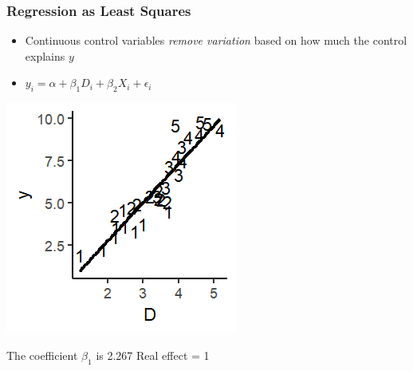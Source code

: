 \documentclass[xcolor=x11names,compress]{beamer}\usepackage[]{graphicx}\usepackage[]{color}
\makeatletter
\def\maxwidth{ %
  \ifdim\Gin@nat@width>\linewidth
    \linewidth
  \else
    \Gin@nat@width
  \fi
}
\newenvironment{knitrout}{}{} %
\renewcommand{\(}{\begin{columns}}
\renewcommand{\)}{\end{columns}}
\newcommand{\<}[1]{\begin{column}{#1}}
\renewcommand{\>}{\end{column}}
\makeatother
\begin{document}
\begin{frame}
\frametitle{Regression as Least Squares}
\begin{itemize}
\item Continuous control variables \textit{remove variation} based on how much the control explains $y$
\item $y_i = \alpha + \beta_1 D_i + \beta_2 X_i + \epsilon_i$
\end{itemize}
\begin{multicols}{2}
\begin{knitrout}
\color{fgcolor}
\includegraphics[width=\maxwidth]{figure/graph_ols_control2-1} 

\end{knitrout}
\columnbreak
The coefficient $\beta_1$ is 2.267
Real effect = 1
\end{multicols}
\end{frame}
\end{document}
